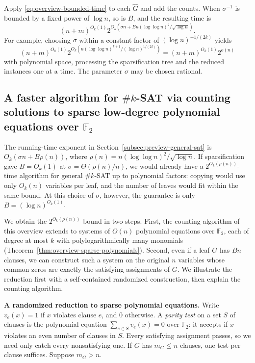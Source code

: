 Apply \eqref{eq:overview-bounded-time} to each $\widehat G$ and add
the counts. When $\sigma^{-1}$ is bounded by a fixed power of
$\log n$, so is $B$, and the resulting time is
\[
 (n+m)^{O_k(1)}
 2^{O_k\!\left(\sigma n+
          Bn(\log\log n)^2/\sqrt{\log n}\right)}.
\]
For example, choosing $\sigma$ within a constant factor of
$(\log n)^{-1/(2k)}$ yields
\[
 (n+m)^{O_k(1)}
 2^{O_k\!\left(n(\log\log n)^{k+1}/(\log n)^{1/(2k)}\right)}
   = (n+m)^{O_k(1)}2^{o(n)}
\]
with polynomial space, processing the sparsification tree and
the reduced instances one at a time. The parameter $\sigma$ may
be chosen rational.

\subsection{A faster algorithm for \texorpdfstring{$\#k$-SAT}{\#k-SAT} via counting solutions to sparse low-degree polynomial equations over \texorpdfstring{$\mathbb F_2$}{F\_2}}
\label{subsec:preview-full-case}

The running-time exponent in Section~\ref{subsec:preview-general-sat}
is $O_k(\sigma n+B\rho(n))$, where
$\rho(n)=n(\log\log n)^2/\sqrt{\log n}$. If sparsification gave
$B=O_k(1)$ at $\sigma=\Theta(\rho(n)/n)$, we would already have a
$2^{O_k(\rho(n))}$-time algorithm for general $\#k$-SAT up to
polynomial factors: copying would use only $O_k(n)$ variables per
leaf, and the number of leaves would fit within the same bound.
At this choice of $\sigma$, however, the guarantee is only
$B=(\log n)^{O_k(1)}$.

We obtain the $2^{O_k(\rho(n))}$ bound in two steps. First, the counting
algorithm of this overview extends to systems of $O(n)$ polynomial
equations over $\mathbb F_2$, each of degree at most $k$ with
polylogarithmically many monomials
(Theorem~\ref{thm:overview-sparse-polynomials}). Second, even if a
leaf $G$ has $Bn$ clauses, we can construct such a system on the
original $n$ variables whose common zeros are exactly the satisfying
assignments of $G$. We illustrate the reduction first with a
self-contained randomized construction, then explain the counting
algorithm.

\medskip\noindent
\textbf{A randomized reduction to sparse polynomial equations.}
Write $v_e(x)=1$ if $x$ violates clause $e$, and $0$ otherwise. A
\emph{parity test} on a set $S$ of clauses is the polynomial equation
$\sum_{e\in S}v_e(x)=0$ over $\mathbb F_2$: it accepts if $x$ violates
an even number of clauses in $S$. Every satisfying assignment passes,
so we need only catch every nonsatisfying one. If $G$ has $m_G\le n$
clauses, one test per clause suffices. Suppose $m_G>n$.

